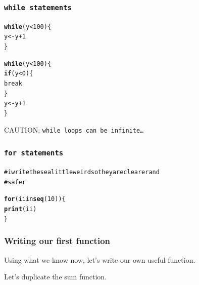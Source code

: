 \documentclass{beamer}\usepackage{graphicx, color}
\makeatletter
\newcommand{\hlfunctioncall}[1]{\textcolor[rgb]{0.501960784313725,0,0.329411764705882}{\textbf{#1}}}%
\newcommand{\hlcomment}[1]{\textcolor[rgb]{0.180392156862745,0.6,0.341176470588235}{#1}}%
\newenvironment{kframe}{%
 \def\at@end@of@kframe{}%
 \ifinner\ifhmode%
  \def\at@end@of@kframe{\end{minipage}}%
  \begin{minipage}{\columnwidth}%
 \fi\fi%
 \def\FrameCommand##1{\hskip\@totalleftmargin \hskip-\fboxsep
 \colorbox{shadecolor}{##1}\hskip-\fboxsep
     \hskip-\linewidth \hskip-\@totalleftmargin \hskip\columnwidth}%
 \MakeFramed {\advance\hsize-\width
   \@totalleftmargin\z@ \linewidth\hsize
   \@setminipage}}%
 {\par\unskip\endMakeFramed%
 \at@end@of@kframe}
\newenvironment{knitrout}{}{} %
\makeatother
\begin{document}
\begin{frame}[fragile]
  \frametitle{\tt{while} statements}
\begin{knitrout}\small
{}\color{fgcolor}\begin{kframe}
\begin{alltt}
\hlfunctioncall{while} (y < 100) \{
    y <- y + 1
\}

\hlfunctioncall{while} (y < 100) \{
    \hlfunctioncall{if} (y < 0) \{
        break
    \}
    y <- y + 1
\}
\end{alltt}
\end{kframe}
\end{knitrout}


  CAUTION: \tt{while} loops can be infinite\dots

\end{frame}

\begin{frame}[fragile]
  \frametitle{\tt{for} statements}
\begin{knitrout}\small
{}\color{fgcolor}\begin{kframe}
\begin{alltt}
\hlcomment{# i write these a little weird so they are clearer and}
\hlcomment{# safer}

\hlfunctioncall{for} (ii in \hlfunctioncall{seq}(10)) \{
    \hlfunctioncall{print}(ii)
\}

\end{alltt}
\end{kframe}
\end{knitrout}


\end{frame}

\begin{frame}
  \frametitle{Writing our first function}
  Using what we know now, let's write our own useful function.

  Let's duplicate the sum function.

\end{frame}
\end{document}

